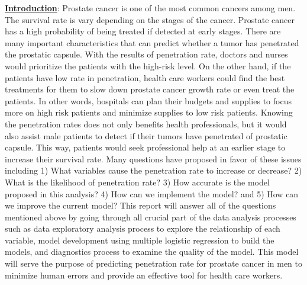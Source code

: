 \documentclass[11pt]{article}\usepackage[]{graphicx}\usepackage[]{color}
\begin{document}
\noindent\textbf{\underline{Introduction}}: Prostate cancer is one of the most common cancers among men. The survival rate is vary depending on the stages of the cancer. Prostate cancer has a high probability of being treated if detected at early stages. There are many important characteristics that can predict whether a tumor has penetrated the prostatic capsule. With the results of penetration rate, doctors and nurses would prioritize the patients with the high-risk level. On the other hand, if the patients have low rate in penetration, health care workers could find the best treatments for them to slow down prostate cancer growth rate or even treat the patients. In other words, hospitals can plan their budgets and supplies to focus more on high risk patients and minimize supplies to low risk patients. Knowing the penetration rates does not only benefits health professionals, but it would also assist male patients to detect if their tumors have penetrated of prostatic capsule. This way, patients would seek professional help at an earlier stage to increase their survival rate. Many questions have proposed in favor of these issues including 1) What variables cause the penetration rate to increase or decrease? 2) What is the likelihood of penetration rate? 3) How accurate is the model proposed in this analysis? 4) How can we implement the model? and 5) How can we improve the current model? This report will answer all of the questions mentioned above by going through all crucial part of the data analysis processes such as data exploratory analysis process to explore the relationship of each variable, model development using multiple logistic regression to build the models, and diagnostics process to examine the quality of the model. This model will serve the purpose of predicting penetration rate for prostate cancer in men to minimize human errors and provide an effective tool for health care workers.
\hfill \break
\end{document}
